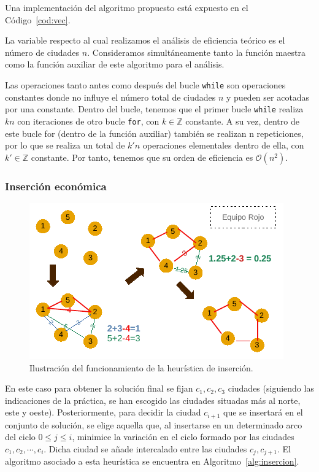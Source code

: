 Una implementación del algoritmo propuesto está expuesto en el Código~\ref{cod:vec}. 




La variable respecto al cual realizamos el análisis de eficiencia teórico es el número
de ciudades $n$. Consideramos simultáneamente tanto la función maestra como la función
auxiliar de este algoritmo para el análisis. 

Las operaciones tanto antes como después del bucle \texttt{while} son operaciones constantes
donde no influye el número total de ciudades $n$ y pueden ser acotadas por una
constante. Dentro del bucle, tenemos que
el primer bucle  \texttt{while} realiza $kn$ con iteraciones de otro bucle \texttt{for}, con 
$k \in \mathbb Z$ constante. A su vez, dentro de este bucle for (dentro de la función auxiliar) 
también se realizan n repeticiones,
por lo que se realiza un total de $k'n$ operaciones elementales dentro de ella, 
con $k' \in \mathbb Z$ constante. Por tanto, tenemos que su orden de 
eficiencia es $\boxed{\mathcal O(n^2)}$. 

\subsubsection{Inserción económica}

\begin{figure}[H] 
  \centering
  \includegraphics[scale=1.5]{img/DibInsercion.pdf}
  \caption{Ilustración del funcionamiento de la heurística de inserción.}
  \label{fig:inser}
\end{figure}

En este caso para obtener la solución final se fijan $c_1,c_2,c_3$ ciudades
(siguiendo las indicaciones de la práctica, se han
escogido las ciudades situadas más al norte, este y oeste). 
Posteriormente,
para decidir la ciudad $c_{i+1}$ que se insertará en el conjunto de solución,
se elige aquella que, al insertarse en un determinado arco del ciclo 
$0 \leq j \leq i$, minimice la variación en el ciclo formado por las ciudades
$c_1,c_2,\cdots,c_{i}$. Dicha ciudad se añade intercalado entre las ciudades
$c_{j},c_{j+1}$. El algoritmo asociado a esta heurística se encuentra en 
Algoritmo~\ref{alg:insercion}. 

